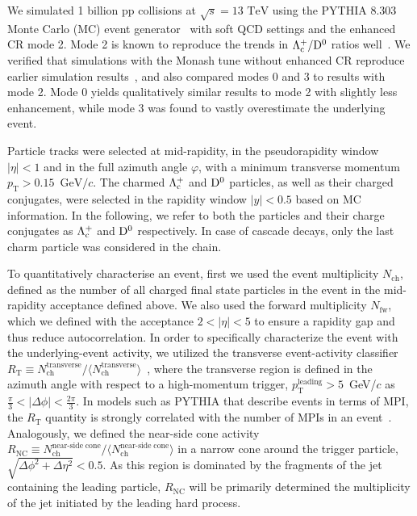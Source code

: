 \documentclass[aps,amsmath,amssymb,a4paper,11pt,superscriptaddress]{revtex4-2}
\newcommand*{\Nch}{\ensuremath{N_\mathrm{ch}}\xspace}
\newcommand*{\Nfw}{\ensuremath{N_\mathrm{fw}}\xspace}
\newcommand*{\RT}{\ensuremath{R_\mathrm{T}}\xspace}
\newcommand*{\pT}{\ensuremath{p_\mathrm{T}}\xspace}
\newcommand*{\GeVc}{\ensuremath{\mathrm{GeV}/c}\xspace}
\newcommand*{\Lc}{\ensuremath{\Lambda_{\rm c}^+}\xspace}
\newcommand*{\Dz}{\ensuremath{\rm D^0}\xspace}
\newcommand*{\LcToDz}{\ensuremath{{\Lambda_{\rm c}^+}/{\rm D^0}}\xspace}
\begin{document}
We simulated 1 billion pp collisions at $\sqrt{s}=13$ $\mathrm{TeV}$ using the PYTHIA 8.303 Monte Carlo (MC) event generator~\cite{Sjostrand:2014zea} with soft QCD settings and the enhanced CR mode 2. Mode 2 is known to reproduce the trends in \LcToDz ratios well~\cite{ALICE:2020wfu,Hills:2021eto}. 
We  verified that simulations with the Monash tune without enhanced CR reproduce earlier simulation results~\cite{ALICE:2020wfu}, and also compared modes 0 and 3 to results with mode 2.
Mode 0 yields qualitatively similar results to mode 2 with slightly less enhancement, while mode 3 was found to vastly overestimate the underlying event. 

Particle tracks were selected at mid-rapidity, in the pseudorapidity window $|\eta|<1$ and in the full azimuth angle $\varphi$, with a minimum transverse momentum \pT$>0.15$~\GeVc.
The charmed \Lc and \Dz particles, as well as their charged conjugates, were selected in the rapidity window $|y|<0.5$ based on MC information. In the following, we refer to both the particles and their charge conjugates as \Lc and \Dz respectively. In case of cascade decays, only the last charm particle was considered in the chain.

To quantitatively characterise an event, first we used the event multiplicity \Nch, defined as the number of all charged final state particles in the event in the mid-rapidity acceptance defined above. We also used the forward multiplicity \Nfw, which we defined with the acceptance $2<|\eta|<5$ to ensure a rapidity gap and thus reduce autocorrelation.
In order to specifically characterize the event with the underlying-event activity, we utilized the 
transverse event-activity classifier $R_\mathrm{T} \equiv N_\mathrm{ch}^{\mathrm{transverse}}/\langle N_\mathrm{ch}^{\mathrm{transverse}}\rangle$~\cite{Martin:2016igp}, where the transverse region is defined in the azimuth angle with respect to a high-momentum trigger, $p_\mathrm{T}^{\mathrm{leading}}>5$~GeV/$c$ as $\frac{\pi}{3}<|\Delta \phi|<\frac{2\pi}{3}$. In models such as PYTHIA that describe events in terms of MPI, the \RT quantity is strongly correlated with the number of MPIs in an event~\cite{Martin:2016igp}.
Analogously, we defined the near-side cone activity $R_\mathrm{NC} \equiv N_\mathrm{ch}^{\mathrm{near\text{-}side\; cone}}/\langle N_\mathrm{ch}^{\mathrm{near\text{-}side\; cone}}\rangle$ in a narrow cone around the trigger particle, $\sqrt{\Delta\phi^2+\Delta\eta^2}<0.5$. As this region is dominated by the fragments of the jet containing the leading particle, $R_\mathrm{NC}$ will be primarily determined the multiplicity of the jet initiated by the leading hard process.
\end{document}
